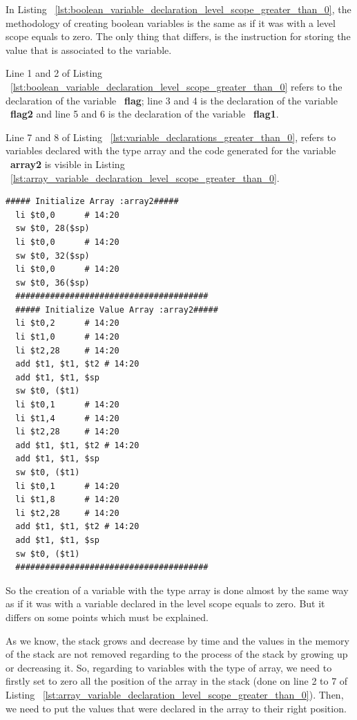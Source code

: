 \documentclass[
  oneside,
  11pt, a4paper,
  footinclude=true,
  headinclude=true,
  cleardoublepage=empty
]{scrbook}
\begin{document}
In Listing ~\ref{lst:boolean_variable_declaration_level_scope_greater_than_0}, the methodology of creating boolean variables is the same as if it was with a level scope equals to zero. The only thing that differs, is the instruction for storing the value that is associated to the variable.

Line 1 and 2 of Listing ~\ref{lst:boolean_variable_declaration_level_scope_greater_than_0} refers to the declaration of the variable ~\textbf{flag}; line 3 and 4 is the declaration of the variable ~\textbf{flag2} and line 5 and 6 is the declaration of the variable ~\textbf{flag1}.

Line 7 and 8 of Listing ~\ref{lst:variable_declarations_greater_than_0}, refers to variables declared with the type array and the code generated for the variable ~\textbf{array2} is visible in Listing ~\ref{lst:array_variable_declaration_level_scope_greater_than_0}.

\begin{lstlisting}[caption={Declaring array variables in level scope greater than 0},label={lst:array_variable_declaration_level_scope_greater_than_0}]
  ##### Initialize Array :array2#####
  li $t0,0		# 14:20
  sw $t0, 28($sp)
  li $t0,0		# 14:20
  sw $t0, 32($sp)
  li $t0,0		# 14:20
  sw $t0, 36($sp)
  #######################################
  ##### Initialize Value Array :array2#####
  li $t0,2		# 14:20
  li $t1,0		# 14:20
  li $t2,28		# 14:20
  add $t1, $t1, $t2	# 14:20
  add $t1, $t1, $sp
  sw $t0, ($t1)
  li $t0,1		# 14:20
  li $t1,4		# 14:20
  li $t2,28		# 14:20
  add $t1, $t1, $t2	# 14:20
  add $t1, $t1, $sp
  sw $t0, ($t1)
  li $t0,1		# 14:20
  li $t1,8		# 14:20
  li $t2,28		# 14:20
  add $t1, $t1, $t2	# 14:20
  add $t1, $t1, $sp
  sw $t0, ($t1)
  #######################################
\end{lstlisting}

So the creation of a variable with the type array is done almost by the same way as if it was with a variable declared in the level scope equals to zero.
But it differs on some points which must be explained.

As we know, the stack grows and decrease by time and the values in the memory of the stack are not removed regarding to the process of the stack by growing up or decreasing it. So, regarding to variables with the type of array, we need to firstly set to zero all the position of the array in the stack (done on line 2 to 7 of Listing ~\ref{lst:array_variable_declaration_level_scope_greater_than_0}). Then, we need to put the values that were declared in the array to their right position.
\end{document}
